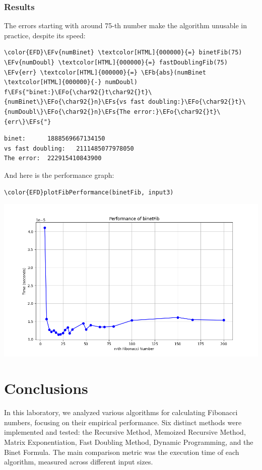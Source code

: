 \documentclass[a4paper,12pt]{article}
\newcommand{\EFs}[1]{\textcolor{EFs}{#1}} %
\newcommand{\EFb}[1]{\textcolor{EFb}{#1}} %
\newcommand{\EFv}[1]{\textcolor{EFv}{#1}} %
\newcommand{\EFo}[1]{\textcolor{EFo}{#1}} %
\begin{document}
\subsubsection{Results}
\label{sec:orgb9708d8}
The errors starting with around 75-th number make the algorithm unusable in practice, despite its speed:
\begin{Code}
\begin{Verbatim}
\color{EFD}\EFv{numBinet} \textcolor[HTML]{000000}{=} binetFib(75)
\EFv{numDoubl} \textcolor[HTML]{000000}{=} fastDoublingFib(75)
\EFv{err} \textcolor[HTML]{000000}{=} \EFb{abs}(numBinet \textcolor[HTML]{000000}{-} numDoubl)
f\EFs{"binet:}\EFo{\char92{}t\char92{}t}\{numBinet\}\EFo{\char92{}n}\EFs{vs fast doubling:}\EFo{\char92{}t}\{numDoubl\}\EFo{\char92{}n}\EFs{The error:}\EFo{\char92{}t}\{err\}\EFs{"}
\end{Verbatim}
\end{Code}

\label{org5e9c946}
\begin{verbatim}
binet:		1888569667134150
vs fast doubling:	2111485077978050
The error:	222915410843900
\end{verbatim}



And here is the performance graph:
\begin{Code}
\begin{Verbatim}
\color{EFD}plotFibPerformance(binetFib, input3)
\end{Verbatim}
\end{Code}

\begin{center}
\includegraphics[width=.9\linewidth]{binetFormulaFib.png}
\label{org6ffa64d}
\end{center}
\section{Conclusions}
\label{sec:orgb7af16d}
In this laboratory, we analyzed various algorithms for calculating Fibonacci numbers, focusing on their empirical performance. Six distinct methods were implemented and tested: the Recursive Method, Memoized Recursive Method, Matrix Exponentiation, Fast Doubling Method, Dynamic Programming, and the Binet Formula. The main comparison metric was the execution time of each algorithm, measured across different input sizes.
\end{document}
